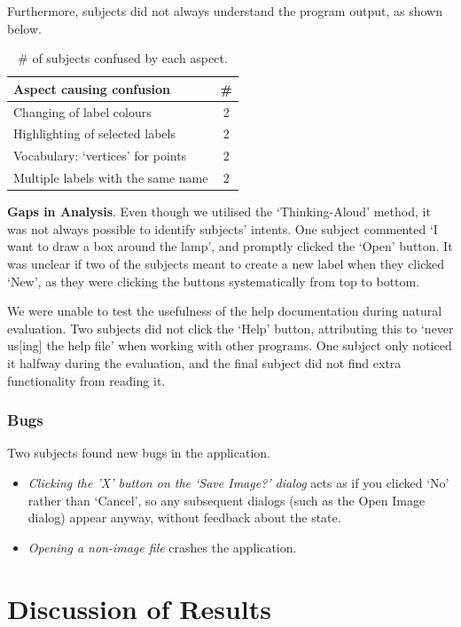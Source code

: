 \documentclass[11pt,twocolumn]{article}
\begin{document}
Furthermore, subjects did not always understand the program output, as shown below.

\begin{table}[h!]
\centering
\begin{tabular}{|l|c|}
\hline
{\bf Aspect causing confusion} & {\bf \#} \\
\hline
Changing of label colours & 2 \\
Highlighting of selected labels & 2 \\
Vocabulary: `vertices' for points & 2 \\
Multiple labels with the same name & 2 \\
\hline
\end{tabular}
\caption{\# of subjects confused by each aspect.}
\label{confusion}
\end{table}

{\bf Gaps in Analysis}. Even though we utilised the `Thinking-Aloud' method, it was not always possible to identify subjects’ intents. One subject commented `I want to draw a box around the lamp', and promptly clicked the `Open' button. It was unclear if two
of the subjects meant to create a new label when they clicked `New', as they were clicking the buttons systematically from top to bottom.

We were unable to test the usefulness of the help documentation during natural evaluation. Two subjects did not click the `Help' button, attributing this to `never us[ing] the help file' when working with other programs. One subject only noticed it halfway during the evaluation, and the final subject did not find extra functionality from reading it.

\subsubsection{Bugs}

Two subjects found new bugs in the application. 
\begin{itemize}
\item \emph{Clicking the 'X' button on the `Save Image?' dialog} acts as if you clicked `No' rather than `Cancel', so any subsequent dialogs (such as the Open Image dialog) appear
anyway, without feedback about the state. 
\item \emph{ Opening a non-image file} crashes the application.
\end{itemize}

\section{Discussion of Results}
\end{document}
